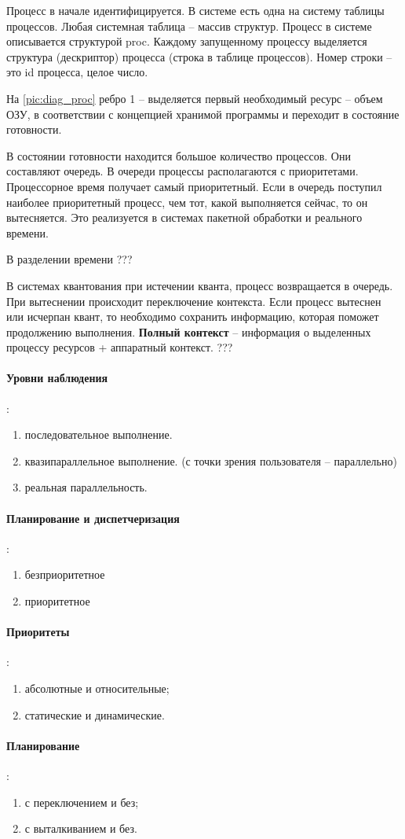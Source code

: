 Процесс в начале идентифицируется. В системе есть одна на систему таблицы процессов. Любая системная таблица – массив структур. Процесс в системе описывается структурой proc. Каждому запущенному процессу выделяется структура (дескриптор) процесса (строка в таблице процессов). Номер строки – это id процесса, целое число. 

На \ref{pic:diag_proc} ребро 1 – выделяется первый необходимый ресурс – объем ОЗУ, в соответствии с концепцией хранимой программы и переходит в состояние готовности.

В состоянии готовности находится большое количество процессов. Они составляют очередь. В очереди процессы располагаются с приоритетами. Процессорное время получает самый приоритетный. Если в очередь поступил наиболее приоритетный процесс, чем тот, какой выполняется сейчас, то он вытесняется. Это реализуется в системах пакетной обработки и реального времени.

В разделении времени ???

В системах квантования при истечении кванта, процесс возвращается в очередь. При вытеснении происходит переключение контекста. Если процесс вытеснен или исчерпан квант, то необходимо сохранить информацию, которая поможет продолжению выполнения. 
\textbf{Полный контекст} – информация о выделенных процессу ресурсов + аппаратный контекст.
???

\paragraph{Уровни наблюдения}: 
\begin{enumerate}
	\item последовательное выполнение.
	\item квазипараллельное выполнение. (с точки зрения пользователя – параллельно)
	\item реальная параллельность.
\end{enumerate}

\paragraph{Планирование и диспетчеризация}: 
\begin{enumerate}
	\item безприоритетное
	\item приоритетное
\end{enumerate}

\paragraph{Приоритеты}: 
\begin{enumerate}
	\item абсолютные и относительные;
	\item статические и динамические.
\end{enumerate}

\paragraph{Планирование}: 
\begin{enumerate}
	\item с переключением и без;
	\item с выталкиванием и без.
\end{enumerate}
